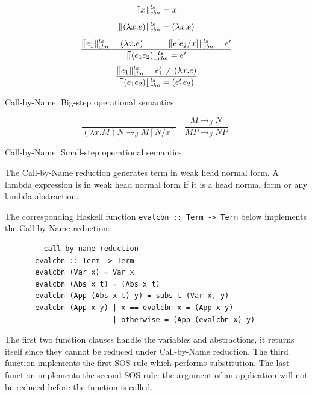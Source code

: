 \begin{equation*}
\llceil x \rrfloor ^{ls} _{cbn} = x
\end{equation*}
\begin{equation*}
\llceil (\lambda x.e) \rrfloor ^{ls} _{cbn} = (\lambda x.e)
\end{equation*}
\begin{equation*}
\frac{\llceil e_1 \rrfloor ^{ls} _{cbn} = (\lambda x.e)\ \ \ \ \ \ \ \ \ \llceil e[e_2/x] \rrfloor ^{ls} _{cbn} = e'}{\llceil (e_1e_2) \rrfloor ^{ls} _{cbn} = e'}
\end{equation*}
\begin{equation*}
\frac{\llceil e_1 \rrfloor ^{ls} _{cbn} = e'_1\neq (\lambda x.e)}{\llceil (e_1e_2) \rrfloor ^{ls} _{cbn} = (e'_1e_2)}
\end{equation*}
\begin{center}
Call-by-Name: Big-step operational semantics
\end{center}

\begin{equation*}
\frac{}{(\lambda x.M)N \rightarrow _\beta M[N/x]}\ \ \ \  
\frac{M \rightarrow _\beta N}{MP \rightarrow _\beta NP}\ \ 
\end{equation*}
\begin{center}
Call-by-Name: Small-step operational semantics
\end{center}

The Call-by-Name reduction generates term in weak head normal form. A lambda expression is in weak head normal form if it is a head normal form or any lambda abstraction. 


The corresponding Haskell function \verb|evalcbn :: Term -> Term| below implements the Call-by-Name reduction:

\begin{verbatim}
       --call-by-name reduction
       evalcbn :: Term -> Term
       evalcbn (Var x) = Var x
       evalcbn (Abs x t) = (Abs x t)
       evalcbn (App (Abs x t) y) = subs t (Var x, y)
       evalcbn (App x y) | x == evalcbn x = (App x y)
	                     | otherwise = (App (evalcbn x) y) 
\end{verbatim}


The first two function clauses handle the variables and abstractions, it returns itself since they cannot be reduced under Call-by-Name reduction. The third function implements the first SOS rule which performs substitution. The last function implements the second SOS rule: the argument of an application will not be reduced before the function is called. 

